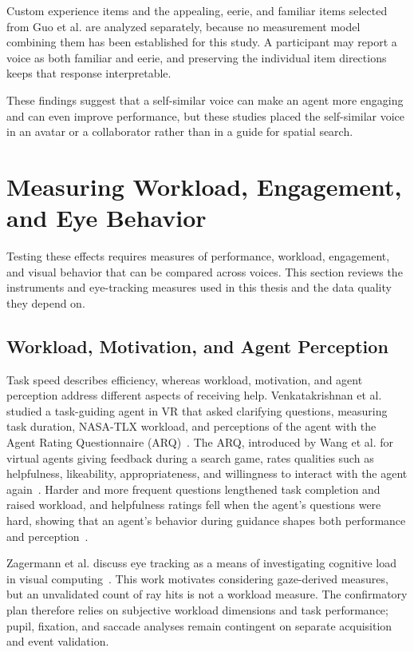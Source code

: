 Custom experience items and the appealing, eerie, and familiar items selected from Guo et al. are analyzed separately, because no measurement model combining them has been established for this study. A participant may report a voice as both familiar and eerie, and preserving the individual item directions keeps that response interpretable.

These findings suggest that a self-similar voice can make an agent more engaging and can even improve performance, but these studies placed the self-similar voice in an avatar or a collaborator rather than in a guide for spatial search.

\section{Measuring Workload, Engagement, and Eye Behavior}
Testing these effects requires measures of performance, workload, engagement, and visual behavior that can be compared across voices. This section reviews the instruments and eye-tracking measures used in this thesis and the data quality they depend on.

\subsection{Workload, Motivation, and Agent Perception}
Task speed describes efficiency, whereas workload, motivation, and agent perception address different aspects of receiving help. Venkatakrishnan et al. studied a task-guiding agent in VR that asked clarifying questions, measuring task duration, NASA-TLX workload, and perceptions of the agent with the Agent Rating Questionnaire (ARQ)~\cite{venkatakrishnan2026clarifying}. The ARQ, introduced by Wang et al. for virtual agents giving feedback during a search game, rates qualities such as helpfulness, likeability, appropriateness, and willingness to interact with the agent again~\cite{wang2020terrible}. Harder and more frequent questions lengthened task completion and raised workload, and helpfulness ratings fell when the agent's questions were hard, showing that an agent's behavior during guidance shapes both performance and perception~\cite{venkatakrishnan2026clarifying}.

Zagermann et al. discuss eye tracking as a means of investigating cognitive load in visual computing~\cite{zagermann2016workload}. This work motivates considering gaze-derived measures, but an unvalidated count of ray hits is not a workload measure. The confirmatory plan therefore relies on subjective workload dimensions and task performance; pupil, fixation, and saccade analyses remain contingent on separate acquisition and event validation.


